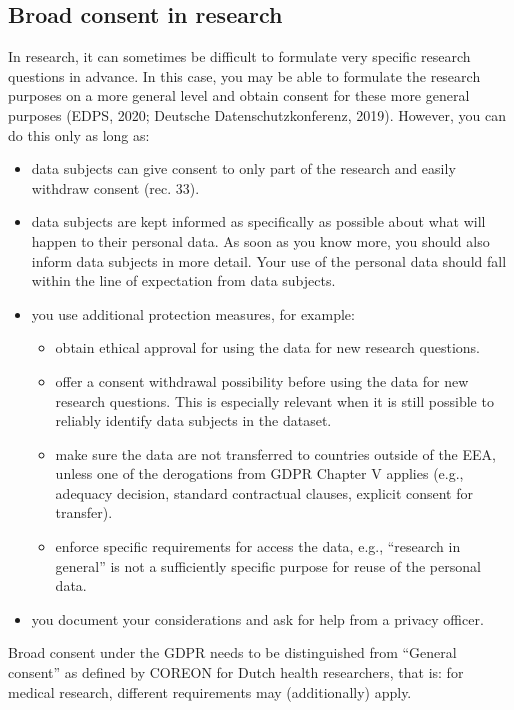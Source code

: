 \documentclass[
]{book}
\providecommand{\tightlist}{%
  \setlength{\itemsep}{0pt}\setlength{\parskip}{0pt}}
\begin{document}
\hypertarget{broad-consent}{%
\subsection{Broad consent in research}\label{broad-consent}}

In research, it can sometimes be difficult to formulate very specific research
questions in advance. In this case, you may be able to formulate the research
purposes on a more general level and obtain consent for these more general
purposes
(EDPS, 2020;
Deutsche Datenschutzkonferenz, 2019).
However, you can do this only as long as:

\begin{itemize}
\tightlist
\item
  data subjects can give consent to only part of the research and easily
  withdraw consent
  (rec. 33).
\item
  data subjects are kept informed as specifically as possible about what will
  happen to their personal data. As soon as you know more, you should also inform
  data subjects in more detail. Your use of the personal data should fall within
  the line of expectation from data subjects.
\item
  you use additional protection measures, for example:

  \begin{itemize}
  \tightlist
  \item
    obtain ethical approval for using the data for new research questions.
  \item
    offer a consent withdrawal possibility before using the data for new research
    questions. This is especially relevant when it is still possible to reliably
    identify data subjects in the dataset.
  \item
    make sure the data are not transferred to countries outside of the EEA,
    unless one of the derogations from GDPR
    Chapter V
    applies (e.g., adequacy decision, standard contractual clauses, explicit
    consent for transfer).
  \item
    enforce specific requirements for access the data, e.g., ``research in general''
    is not a sufficiently specific purpose for reuse of the personal data.
  \end{itemize}
\item
  you document your considerations and ask for help from a
  privacy officer.
\end{itemize}

Broad consent under the GDPR needs to be distinguished from ``General consent''
as defined by
COREON for Dutch health researchers, that is: for medical research, different requirements may
(additionally) apply.
\end{document}
